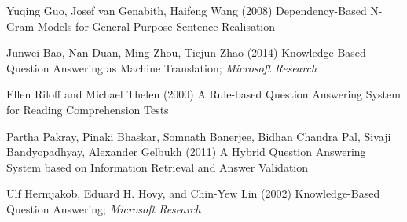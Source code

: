 \documentclass[twoside]{article}
\begin{document}
\begin{thebibliography}{9} %

Yuqing Guo, Josef van Genabith, Haifeng Wang (2008)
\newblock Dependency-Based N-Gram Models for
General Purpose Sentence Realisation

Junwei Bao, Nan Duan, Ming Zhou, Tiejun Zhao (2014)
\newblock Knowledge-Based Question Answering as Machine Translation; \textit{Microsoft Research}
 
Ellen Riloff and Michael Thelen  (2000)
\newblock A Rule-based Question Answering System for Reading Comprehension Tests

Partha Pakray, Pinaki Bhaskar, Somnath Banerjee, Bidhan Chandra Pal, Sivaji Bandyopadhyay, Alexander Gelbukh (2011)
\newblock A Hybrid Question Answering System based on Information Retrieval and Answer Validation

Ulf Hermjakob, Eduard H. Hovy, and Chin-Yew Lin (2002)
\newblock Knowledge-Based Question Answering; \textit{Microsoft Research}

\end{thebibliography}

\end{document}
